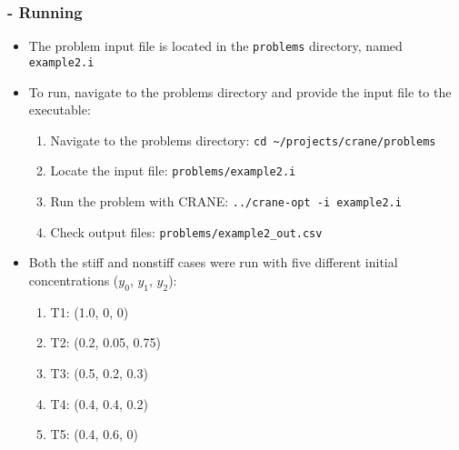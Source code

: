\begin{frame}[fragile]
	\frametitle{\insertsubsectionhead \hspace{1pt} - Running}
		\begin{itemize}
			\item The problem input file is located in the \texttt{problems} directory, named \texttt{example2.i}
			\item To run, navigate to the problems directory and provide the input file to the executable:
			\begin{enumerate}
				\item Navigate to the problems directory: \newline
				\hspace*{8pt} \texttt{cd \textasciitilde/projects/crane/problems}
				\item Locate the input file: \newline
				\hspace*{8pt} \texttt{problems/example2.i}
				\item Run the problem with CRANE: \newline
				\hspace*{8pt} \texttt{../crane-opt -i example2.i}
				\item Check output files: \newline
				\hspace*{8pt} \texttt{problems/example2\_out.csv}
			\end{enumerate}
			\item Both the stiff and nonstiff cases were run with five different initial concentrations ($y_0$, $y_1$, $y_2$): 
			\begin{enumerate}
				\item T1: (1.0, 0, 0)
				\item T2: (0.2, 0.05, 0.75)
				\item T3: (0.5, 0.2, 0.3)
				\item T4: (0.4, 0.4, 0.2)
				\item T5: (0.4, 0.6, 0)
			\end{enumerate}
		\end{itemize}
\end{frame}

